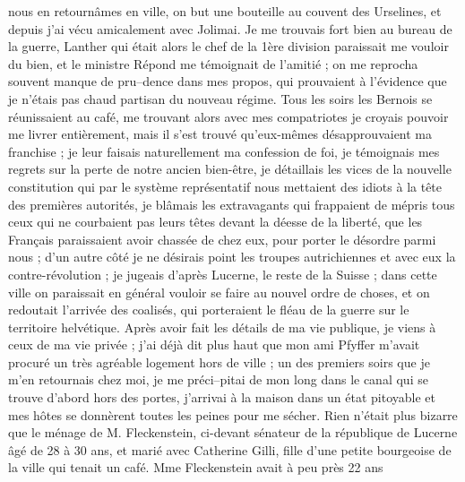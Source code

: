 \documentclass[12pt]{article}
\begin{document}
 nous en retournâmes en ville, on but une bouteille
au couvent des Urselines, et depuis j’ai vécu amicalement avec Jolimai. Je me trouvais fort bien au
bureau de la guerre, Lanther qui était alors le chef de la 1ère division paraissait me vouloir du
bien, et le ministre Répond me témoignait de l’amitié ; on me reprocha souvent manque de pru–dence
dans mes propos, qui prouvaient à l’évidence que je n’étais pas chaud partisan du nouveau régime.
Tous les soirs les Bernois se réunissaient au café, me trouvant alors avec mes compatriotes je
croyais pouvoir me livrer entièrement, mais il s’est trouvé qu’eux-mêmes désapprouvaient ma
franchise ; je leur faisais naturellement ma confession de foi, je témoignais mes regrets sur la
perte de notre ancien bien-être, je détaillais les vices de la nouvelle constitution qui par le
système représentatif nous mettaient des idiots à la tête des premières autorités, je blâmais les
extravagants qui frappaient de mépris tous ceux qui ne courbaient pas leurs têtes devant la déesse
de la liberté, que les Français paraissaient avoir chassée de chez eux, pour porter le désordre
parmi nous ; d’un autre côté je ne désirais point les troupes autrichiennes et avec eux la
contre-révolution ; je jugeais d’après Lucerne, le reste de la Suisse ; dans cette ville on
paraissait en général vouloir se faire au nouvel ordre de choses, et on redoutait l’arrivée des
coalisés, qui porteraient le fléau de la guerre sur le territoire helvétique. Après avoir fait les
détails de ma vie publique, je viens à ceux de ma vie privée ; j’ai déjà dit plus haut que mon ami
Pfyffer m’avait procuré un très agréable logement hors de ville ; un des premiers soirs que je m’en
retournais chez moi, je me préci--pitai de mon long dans le canal qui se trouve d’abord hors des
portes, j’arrivai à la maison dans un état pitoyable et mes hôtes se donnèrent toutes les peines
pour me sécher. Rien n’était plus bizarre que le ménage de M. Fleckenstein, ci-devant sénateur de la
république de Lucerne âgé de 28 à 30 ans, et marié avec Catherine Gilli, fille d’une petite
bourgeoise de la ville qui tenait un café. Mme Fleckenstein avait à peu près 22 ans
\end{document}
